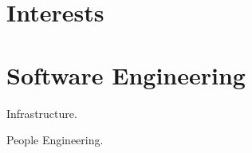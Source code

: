 \documentclass[]{deedy-resume-openfont}
\begin{document}
\begin{minipage}[t]{0.33	\textwidth}

\section{Interests}



\sectionsep


%
%

\end{minipage} 
\hfill
\begin{minipage}[t]{0.66\textwidth} 


\section{Software Engineering}

\vspace{\topsep} %
\begin{tightemize}
\item Infrastructure.
\end{tightemize}
\sectionsep


\vspace{\topsep} %
\begin{tightemize}
\item People Engineering.
\end{tightemize}
\sectionsep


\end{minipage}
\end{document}
